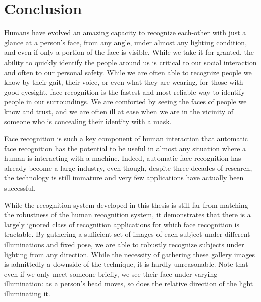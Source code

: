 \chapter{Conclusion}
\label{chap:conclusion}

Humans have evolved an amazing capacity to recognize each-other with just a
glance at a person's face, from any angle, under almost any lighting condition,
and even if only a portion of the face is visible.  While we take it for
granted, the ability to quickly identify the people around us is critical to
our social interaction and often to our personal safety.  While we are often
able to recognize people we know by their gait, their voice, or even what they
are wearing, for those with good eyesight, face recognition is the fastest and
most reliable way to identify people in our surroundings.  We are comforted by
seeing the faces of people we know and trust, and we are often ill at ease when
we are in the vicinity of someone who is concealing their identity with a mask.  

Face recognition is such a key component of human interaction that automatic
face recognition has the potential to be useful in almost any situation where a
human is interacting with a machine.  Indeed, automatic face recognition has
already become a large industry, even though, despite three decades of
research, the technology is still immature and very few applications have
actually been successful.

While the recognition system developed in this thesis is still far from
matching the robustness of the human recognition system, it demonstrates that
there is a largely ignored class of recognition applications for which face
recognition is tractable.  By gathering a sufficient set of images of each
subject under different illuminations and fixed pose, we are able to robustly
recognize subjects under lighting from any direction.  While the necessity of
gathering these gallery images is admittedly a downside of the technique, it is
hardly unreasonable.  Note that even if we only meet someone briefly, we see
their face under varying illumination: as a person's head moves, so does the
relative direction of the light illuminating it.

